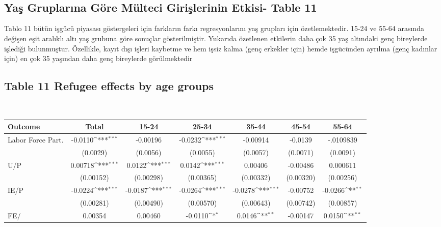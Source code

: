 \documentclass{article}
\begin{document}
\
\
{
\def\sym#1{\ifmmode^{#1}\else\(^{#1}\)\fi}

\
\newpage
    \subsection*{Yaş Gruplarına Göre Mülteci Girişlerinin Etkisi- Table 11}
    Tablo 11 bütün işgücü piyasası göstergeleri için farkların farkı regresyonlarını yaş grupları için özetlemektedir. 15-24 ve 55-64 arasında değişen eşit aralıklı altı yaş grubuna göre sonuçlar gösterilmiştir. Yukarıda özetlenen etkilerin daha çok 35 yaş altındaki genç bireylerde işlediği bulunmuştur. 
Özellikle, kayıt dışı işleri kaybetme ve hem işsiz kalma (genç erkekler için) hemde işgücünden ayrılma (genç kadınlar için) en çok 35 yaşından daha genç bireylerde görülmektedir

\subsection*{Table 11 Refugee effects by age groups}
\
\centering
\begin{tabular}{l*{6}{c}}
\hline
\hline
Outcome
            &\multicolumn{1}{c}{Total}&\multicolumn{1}{c}{15-24}&\multicolumn{1}{c}{25-34}&\multicolumn{1}{c}{35-44}&\multicolumn{1}{c}{45-54}&\multicolumn{1}{c}{55-64}\\
\hline
Labor Force Part.   &   -0.0110\sym{***}&     -0.00196 &     -0.0232\sym{***}&     -0.00914          &      -0.0139         &      -.0109839\\
            &  (0.0029)         &    (0.0056)         &    (0.0055)         &    (0.0057)         &    (0.0071)         &    (0.0091)         \\
[1em]
U/P         &     0.00718\sym{***}&      0.0122\sym{***}&      0.0142\sym{***}&     0.00406         &    -0.00486         &    0.000611         \\
            &   (0.00152)         &   (0.00298)         &   (0.00365)         &   (0.00332)         &   (0.00320)         &   (0.00256)         \\
[1em]
IE/P        &     -0.0224\sym{***}&     -0.0187\sym{***}&     -0.0264\sym{***}&     -0.0278\sym{***}&    -0.00752         &     -0.0266\sym{**} \\
            &   (0.00281)         &   (0.00490)         &   (0.00570)         &   (0.00643)         &   (0.00742)         &   (0.00857)         \\
[1em]
FE/         &     0.00354         &     0.00460         &     -0.0110\sym{*}  &      0.0146\sym{**} &    -0.00147         &      0.0150\sym{**} \\

\end{tabular}}
\end{document}
